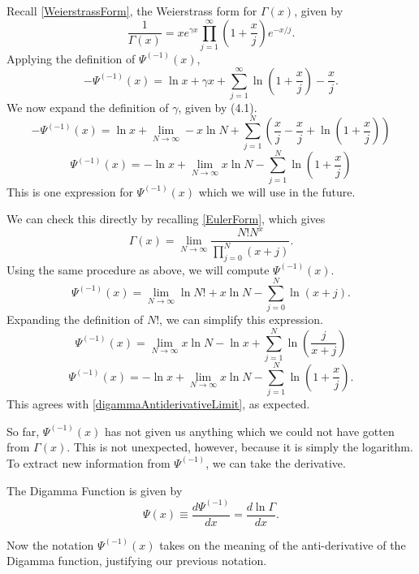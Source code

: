 Recall \eqref{WeierstrassForm}, the Weierstrass form for $\Gamma(x)$, given by
$$\frac{1}{\Gamma(x)} = xe^{\gamma x} \prod_{j=1}^\infty \left( 1 + \frac{x}{j}\right) e^{-x/j}.$$
Applying the definition of $\Psi^{(-1)}(x)$,
\begin{equation}\label{digammaAntiderivativeWeierstrass}
-\Psi^{(-1)} (x) = \ln x + \gamma x + \sum_{j=1}^\infty \ln \left(1 + \frac{x}{j}\right) - \frac{x}{j}.
\end{equation}
We now expand the definition of $\gamma$, given by (4.1).
$$-\Psi^{(-1)} (x) = \ln x + \lim_{N \rightarrow \infty} -x\ln N + \sum_{j=1}^N \left(\frac{x}{j} - \frac{x}{j} + \ln \left( 1 + \frac{x}{j} \right) \right)$$
\begin{equation}\label{digammaAntiderivativeLimit}
\Psi^{(-1)} (x) = -\ln x + \lim_{N \rightarrow \infty} x\ln N - \sum_{j=1}^N \ln \left(1 + \frac{x}{j}\right)
\end{equation}
This is one expression for $\Psi^{(-1)}(x)$ which we will use in the future.

We can check this directly by recalling \eqref{EulerForm}, which gives
$$\Gamma(x) = \lim_{N \rightarrow \infty} \frac{N! N^x}{\prod_{j=0}^N (x+j)}.$$
Using the same procedure as above, we will compute $\Psi^{(-1)}(x)$.
$$\Psi^{(-1)}(x) = \lim_{N \rightarrow \infty} \ln N! + x\ln N - \sum_{j=0}^N \ln (x + j).$$
Expanding the definition of $N!$, we can simplify this expression.
$$\Psi^{(-1)}(x) = \lim_{N \rightarrow \infty} x\ln N - \ln x + \sum_{j=1}^N \ln \left( \frac{j}{x+j} \right)$$
$$\Psi^{(-1)} (x) = -\ln x + \lim_{N \rightarrow \infty} x\ln N - \sum_{j=1}^N \ln \left(1 + \frac{x}{j}\right).$$
This agrees with \eqref{digammaAntiderivativeLimit}, as expected.

So far, $\Psi^{(-1)}(x)$ has not given us anything which we could not have gotten from $\Gamma(x)$.
This is not unexpected, however, because it is simply the logarithm.
To extract new information from $\Psi^{(-1)}$, we can take the derivative.

\begin{defn}
The Digamma Function is given by
\begin{equation}\label{digammaDefinition}
\Psi(x) \equiv \frac{d \Psi^{(-1)}}{dx} = \frac{d \ln \Gamma}{dx}.
\end{equation}
\end{defn}

Now the notation $\Psi^{(-1)}(x)$ takes on the meaning of the anti-derivative of the Digamma function, justifying our previous notation.  

